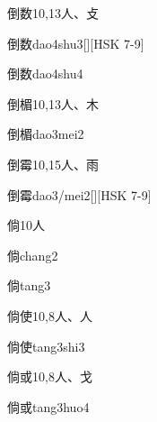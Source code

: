 \begin{Entry}{倒数}{10,13}{⼈、⽁}
  \begin{Phonetics}{倒数}{dao4shu3}[][HSK 7-9]
  \end{Phonetics}
  \begin{Phonetics}{倒数}{dao4shu4}
  \end{Phonetics}
\end{Entry}

\begin{Entry}{倒楣}{10,13}{⼈、⽊}
  \begin{Phonetics}{倒楣}{dao3mei2}
  \end{Phonetics}
\end{Entry}

\begin{Entry}{倒霉}{10,15}{⼈、⾬}
  \begin{Phonetics}{倒霉}{dao3/mei2}[][HSK 7-9]
  \end{Phonetics}
\end{Entry}

\begin{Entry}{倘}{10}{⼈}
  \begin{Phonetics}{倘}{chang2}
  \end{Phonetics}
  \begin{Phonetics}{倘}{tang3}
  \end{Phonetics}
\end{Entry}

\begin{Entry}{倘使}{10,8}{⼈、⼈}
  \begin{Phonetics}{倘使}{tang3shi3}
  \end{Phonetics}
\end{Entry}

\begin{Entry}{倘或}{10,8}{⼈、⼽}
  \begin{Phonetics}{倘或}{tang3huo4}
  \end{Phonetics}
\end{Entry}

